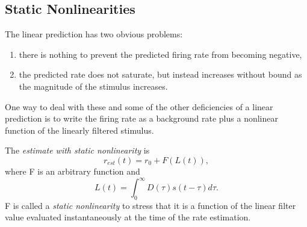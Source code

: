 \subsection{Static Nonlinearities}
\begin{rem}
  The linear prediction has two obvious problems:
  \begin{enumerate}
  \item there is nothing to prevent the predicted firing rate from becoming negative,
  \item the predicted rate does not saturate, but instead increases without bound as the magnitude of the stimulus increases.
  \end{enumerate}
  One way to deal with these and some of the other deficiencies of a linear prediction is to write the firing rate as a background rate plus a nonlinear function of the linearly filtered stimulus.
\end{rem}

\begin{defn}
  \label{def:staticNonlinearity}
  The \emph{estimate with static nonlinearity} is
  \begin{equation}
    \label{equ:2.8}
    r_{est}(t) = r_0 + F(L(t)),
  \end{equation}
  where F is an arbitrary function and
  \begin{equation}
    \label{equ:2.7}
    L(t) = \int_0^{\infty}D(\tau)s(t-\tau)d\tau.
  \end{equation}
  F is called a \emph{static nonlinearity} to stress that it is a function of the linear filter value evaluated instantaneously at the time of the rate estimation.
\end{defn}

